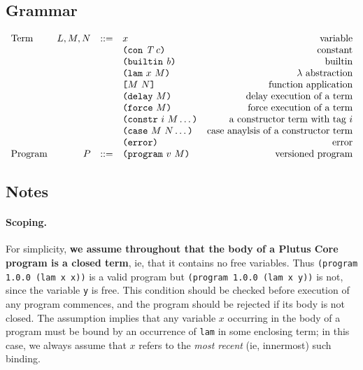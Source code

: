 \subsection{Grammar}
\begin{minipage}{\linewidth}
    \centering
    \[\begin{array}{lrclr}
    \textrm{Term}       & L,M,N  & ::= & x                      & \textrm{variable}\\
                        &        &     & \texttt{(} \texttt{con} ~ \textit{T} ~ c \texttt{)}           & \textrm{constant}\\
                        &        &     & \texttt{(} \texttt{builtin} ~ \mathit{b} \texttt{)}            & \textrm{builtin}\\
                        &        &     & \texttt{(} \texttt{lam} ~ x ~ M  \texttt{)}            & \textrm{$\lambda$ abstraction}\\
                        &        &     & \texttt{[} M ~ N \texttt{]}            & \textrm{function application}\\
                        &        &     & \texttt{(} \texttt{delay} ~ M \texttt{)}              & \textrm{delay execution of a term}\\
                        &        &     & \texttt{(} \texttt{force} ~ M \texttt{)}              & \textrm{force execution of a term}\\
                        &        &     & \texttt{(} \texttt{constr} ~ i ~ M \ldots \texttt{)}   & \textrm{a constructor term with tag $i$}\\
                        &        &     & \texttt{(} \texttt{case} ~ M ~ N \ldots \texttt{)}     & \textrm{case anaylsis of a constructor term}\\
                        &        &     & \texttt{(} \texttt{error} \texttt{)}                & \textrm{error}\\
        \textrm{Program}& P      & ::= & \texttt{(} \texttt{program} ~ v ~ M \texttt{)}         & \textrm{versioned program}

    \end{array}\]
    \label{fig:untyped-grammar}
\end{minipage}


\subsection{Notes}
\label{sec:grammar-notes}
\paragraph{Scoping.} For simplicity, \textbf{we assume throughout that the body of a
Plutus Core program is a closed term}, ie, that it contains no free
variables.  Thus \texttt{(program 1.0.0 (lam x x))} is a valid program but
\texttt{(program 1.0.0 (lam x y))} is not, since the variable \texttt{y} is
free. This condition should be checked before execution of any program
commences, and the program should be rejected if its body is not closed.  The
assumption implies that any variable $x$ occurring in the body of a program must
be bound by an occurrence of \texttt{lam} in some enclosing term; in this case,
we always assume that $x$ refers to the \textit{most recent} (ie, innermost)
such binding.

